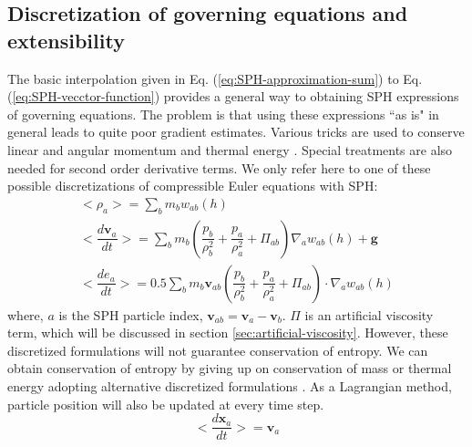 \documentclass[journal abbreviation, manuscript]{copernicus}
\begin{document}
\subsection{Discretization of governing equations and extensibility}
The basic interpolation given in Eq. (\ref{eq:SPH-approximation-sum}) to Eq. (\ref{eq:SPH-vecctor-function}) provides a general way to obtaining SPH expressions of governing equations. The problem is that using these expressions ``{as is}" in general leads to quite poor gradient estimates. Various tricks are used to conserve linear and angular momentum and thermal energy \citep{monaghan1992smoothed}. Special treatments are also needed for second order derivative terms. We only refer here to one of these possible discretizations of compressible Euler equations with SPH:
\begin{align}
<\rho_a> = \sum_b m_b w_{ab} (h) \label{eq:ns-sph-d} \\
<\dfrac{d \textbf{v}_a}{d t}>= \sum_b m_b (\dfrac{p_b}{\rho_b^2} + \dfrac{p_a}{\rho_a^2} + \Pi_{ab}) \nabla_a w_{a b}(h) +\textbf{g} \label{eq:ns-sph-v} \\
<\dfrac{d e_a}{d t}>=
 0.5\sum_b m_b \textbf{v}_{a b}(\dfrac{p_b}{\rho_b^2} + \dfrac{p_a}{\rho_a^2} + \Pi_{ab}) \cdot \nabla_a w_{a b}(h) \label{eq:ns-sph-e}
\end{align}
where, $a$ is the SPH particle index, $\textbf{v}_{a b} = \textbf{v}_a - \textbf{v}_b$. $\Pi$ is an artificial viscosity term, which will be discussed in section \ref{sec:artificial-viscosity}.
However, these discretized formulations will not guarantee conservation of entropy. We can obtain conservation of entropy by giving up on conservation of mass or thermal energy adopting  alternative discretized formulations \citep{monaghan1992smoothed}. 
As a Lagrangian method, particle position will also be updated at every time step.
\begin{equation}
<\dfrac{d \textbf{x}_a}{dt}> = \textbf{v}_a \label{eq:SPH-update-pos}
\end{equation}
\end{document}
